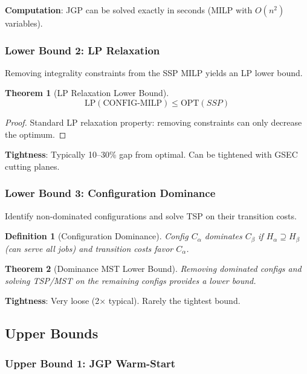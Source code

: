 \documentclass[12pt]{article}
\newtheorem{theorem}{Theorem}[section]
\newtheorem{definition}{Definition}[section]
\begin{document}
	\textbf{Computation}: JGP can be solved exactly in seconds (MILP with $O(n^2)$ variables).
	
	\subsubsection{Lower Bound 2: LP Relaxation}
	
	Removing integrality constraints from the SSP MILP yields an LP lower bound.
	
	\begin{theorem}[LP Relaxation Lower Bound]
		$$\text{LP}(\text{CONFIG-MILP}) \le \text{OPT}(SSP)$$
	\end{theorem}
	\begin{proof}
		Standard LP relaxation property: removing constraints can only decrease the optimum.
	\end{proof}
	
	\textbf{Tightness}: Typically 10--30\% gap from optimal. Can be tightened with GSEC cutting planes.
	
	\subsubsection{Lower Bound 3: Configuration Dominance}
	
	Identify non-dominated configurations and solve TSP on their transition costs.
	
	\begin{definition}[Configuration Dominance]
		Config $C_\alpha$ dominates $C_\beta$ if $H_\alpha \supseteq H_\beta$ (can serve all jobs) and transition costs favor $C_\alpha$.
	\end{definition}
	
	\begin{theorem}[Dominance MST Lower Bound]
		\label{thm:dominance_lb}
		Removing dominated configs and solving TSP/MST on the remaining configs provides a lower bound.
	\end{theorem}
	
	\textbf{Tightness}: Very loose (2× typical). Rarely the tightest bound.
	
	\subsection{Upper Bounds}
	
	\subsubsection{Upper Bound 1: JGP Warm-Start}
	
\end{document}
